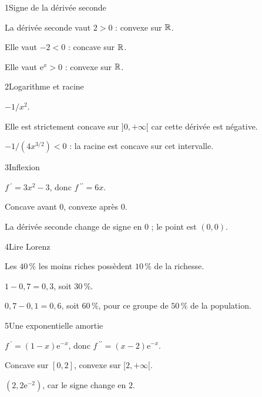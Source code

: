 \begin{corrige}{1}{Signe de la dérivée seconde}
\begin{questions}
\item La dérivée seconde vaut $2>0$ : convexe sur $\mathbb{R}$.
\item Elle vaut $-2<0$ : concave sur $\mathbb{R}$.
\item Elle vaut $\mathrm e^x>0$ : convexe sur $\mathbb{R}$.
\end{questions}
\end{corrige}
\begin{corrige}{2}{Logarithme et racine}
\begin{questions}
\item $-1/x^2$.
\item Elle est strictement concave sur $]0,+\infty[$ car cette dérivée est négative.
\item $-1/(4x^{3/2})<0$ : la racine est concave sur cet intervalle.
\end{questions}
\end{corrige}
\begin{corrige}{3}{Inflexion}
\begin{questions}
\item $f\,\!^{\prime}=3x^2-3$, donc $f\,\!^{\prime\prime}=6x$.
\item Concave avant $0$, convexe après $0$.
\item La dérivée seconde change de signe en $0$ ; le point est $(0,0)$.
\end{questions}
\end{corrige}
\begin{corrige}{4}{Lire Lorenz}
\begin{questions}
\item Les $40\,\%$ les moins riches possèdent $10\,\%$ de la richesse.
\item $1-0{,}7=0{,}3$, soit $30\,\%$.
\item $0{,}7-0{,}1=0{,}6$, soit $60\,\%$, pour ce groupe de $50\,\%$ de la population.
\end{questions}
\end{corrige}
\begin{corrige}{5}{Une exponentielle amortie}
\begin{questions}
\item $f\,\!^{\prime}=(1-x)\mathrm e^{-x}$, donc $f\,\!^{\prime\prime}=(x-2)\mathrm e^{-x}$.
\item Concave sur $[0,2]$, convexe sur $[2,+\infty[$.
\item $(2,2\mathrm e^{-2})$, car le signe change en $2$.
\end{questions}
\end{corrige}
